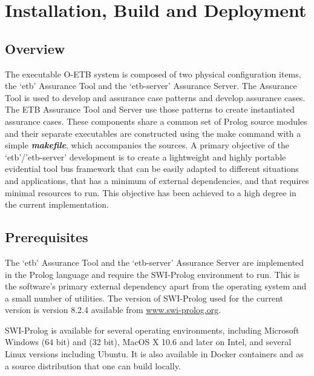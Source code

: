 \documentclass[12pt,twoside,a4paper]{article}
\begin{document}
\clearpage
\hypertarget{installation-build-and-deployment}{%
\section{Installation, Build and Deployment}\label{installation-build-and-deployment}}

\hypertarget{overview}{%
\subsection{Overview}\label{overview}}

The executable O-ETB system is composed of two physical configuration items, the `etb' Assurance Tool and the `etb-server' Assurance Server. The Assurance Tool is used to develop and assurance case patterns and develop assurance cases. The ETB Assurance Tool and Server use those patterns to create instantiated assurance cases. These components share a common set of Prolog source modules and their separate executables are constructed using the make command with a simple \emph{\textbf{makefile}}, which accompanies the sources. A primary objective of the `etb'/'etb-server' development is to create a lightweight and highly portable evidential tool bus framework that can be easily adapted to different situations and applications, that has a minimum of external dependencies, and that requires minimal resources to run. This objective has been achieved to a high degree in the current implementation.

\hypertarget{prerequisites}{%
\subsection{Prerequisites}\label{prerequisites}}

The `etb' Assurance Tool and the `etb-server' Assurance Server are implemented in the Prolog language and require the SWI-Prolog environment to run. This is the software's primary external dependency apart from the operating system and a small number of utilities. The version of SWI-Prolog used for the current version is version 8.2.4 available from \href{http://www.swi-prolog.org}{www.swi-prolog.org}.

SWI-Prolog is available for several operating environments, including Microsoft Windows (64 bit) and (32 bit), MacOS X 10.6 and later on Intel, and several Linux versions including Ubuntu. It is also available in Docker containers and as a source distribution that one can build locally.
\end{document}
